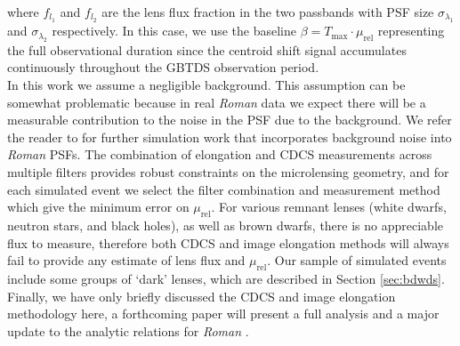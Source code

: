 \documentclass[twocolumn]{aastex631}
\begin{document}
\noindent where $f_{l_1}$ and $f_{l_2}$ are the lens flux fraction in the two passbands with PSF size $\sigma_{\lambda_1}$ and $\sigma_{\lambda_2}$ respectively. In this case, we use the baseline $\beta= T_{\text{max}} \cdot \mu_{\text{rel}}$ representing the full observational duration since the centroid shift signal accumulates continuously throughout the GBTDS observation period.\\
\indent In this work we assume a negligible background. This assumption can be somewhat problematic because in real \textit{Roman} data we expect there will be a measurable contribution to the noise in the PSF due to the background. We refer the reader to \cite{verma:inprep} for further simulation work that incorporates background noise into \textit{Roman} PSFs. The combination of elongation and CDCS measurements across multiple filters provides robust constraints on the microlensing geometry, and for each simulated event we select the filter combination and measurement method which give the minimum error on $\mu_{\textrm{rel}}$. For various remnant lenses (white dwarfs,  neutron stars, and black holes), as well as brown dwarfs, there is no appreciable flux to measure, therefore both CDCS and image elongation methods will always fail to provide any estimate of lens flux and $\mu_{\textrm{rel}}$. Our sample of simulated events include some groups of `dark' lenses, which are described in Section \ref{sec:bdwds}. Finally, we have only briefly discussed the CDCS and image elongation methodology here, a forthcoming paper will present a full analysis and a major update to the \cite*{bennett:2007a} analytic relations for \textit{Roman} \citep{verma:inprep}.
\end{document}
